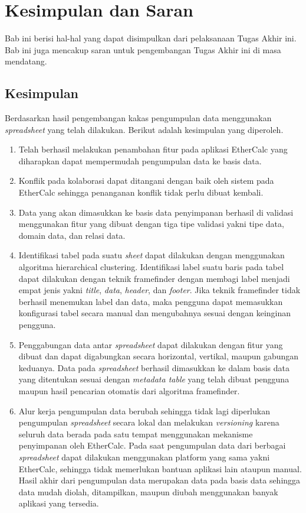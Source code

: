 \chapter{Kesimpulan dan Saran}
Bab ini berisi hal-hal yang dapat disimpulkan dari pelaksanaan Tugas Akhir ini. Bab ini juga mencakup saran untuk pengembangan Tugas Akhir ini di masa mendatang.

\section{Kesimpulan}
Berdasarkan hasil pengembangan kakas pengumpulan data menggunakan \textit{spreadsheet} yang telah dilakukan. Berikut adalah kesimpulan yang diperoleh.
\begin{enumerate}
	\item Telah berhasil melakukan penambahan fitur pada aplikasi EtherCalc yang diharapkan dapat mempermudah pengumpulan data ke basis data.
	\item Konflik pada kolaborasi dapat ditangani dengan baik oleh sistem pada EtherCalc sehingga penanganan konflik tidak perlu dibuat kembali.
	\item Data yang akan dimasukkan ke basis data penyimpanan berhasil di validasi menggunakan fitur yang dibuat dengan tiga tipe validasi yakni tipe data, domain data, dan relasi data.
	\item Identifikasi tabel pada suatu \textit{sheet} dapat dilakukan dengan menggunakan algoritma hierarchical clustering. Identifikasi label suatu baris pada tabel dapat dilakukan dengan teknik framefinder dengan membagi label menjadi empat jenis yakni \textit{title}, \textit{data}, \textit{header}, dan \textit{footer}. Jika teknik framefinder tidak berhasil menemukan label dan data, maka pengguna dapat memasukkan konfigurasi tabel secara manual dan mengubahnya sesuai dengan keinginan pengguna. 
	\item Penggabungan data antar \textit{spreadsheet} dapat dilakukan dengan fitur yang dibuat dan dapat digabungkan secara horizontal, vertikal, maupun gabungan keduanya. Data pada \textit{spreadsheet} berhasil dimasukkan ke dalam basis data yang ditentukan sesuai dengan \textit{metadata table} yang telah dibuat pengguna maupun hasil pencarian otomatis dari algoritma framefinder.
	\item Alur kerja pengumpulan data berubah sehingga tidak lagi diperlukan pengumpulan \textit{spreadsheet} secara lokal dan melakukan \textit{versioning} karena seluruh data berada pada satu tempat menggunakan mekanisme penyimpanan oleh EtherCalc. Pada saat pengumpulan data dari berbagai \textit{spreadsheet} dapat dilakukan menggunakan platform yang sama yakni EtherCalc, sehingga tidak memerlukan bantuan aplikasi lain ataupun manual. Hasil akhir dari pengumpulan data merupakan data pada basis data sehingga data mudah diolah, ditampilkan, maupun diubah menggunakan banyak aplikasi yang tersedia.
\end{enumerate}

